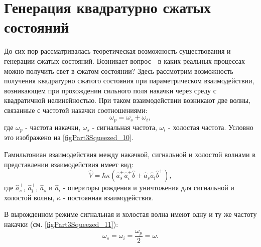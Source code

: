\section{Генерация квадратурно сжатых состояний}
\label{pNonClassGenerSqueezed}
До сих пор рассматривалась теоретическая возможность существования и
генерации сжатых состояний. Возникает вопрос - в каких реальных
процессах можно получить свет в сжатом состоянии? Здесь рассмотрим
возможность получения квадратурно сжатого состояния при
параметрическом взаимодействии, возникающем при прохождении сильного
поля накачки через среду с квадратичной нелинейностью. При таком
взаимодействии возникают две волны, связанные с частотой накачки
соотношениями:
\begin{equation}
\omega_p = \omega_s + \omega_i,
\nonumber
\end{equation}
где $\omega_p$ - частота накачки, $\omega_s$ - сигнальная частота,
$\omega_i$ - холостая частота. Условно это изображено на 
\autoref{figPart3Squeezed_10}.



Гамильтониан взаимодействия между накачкой, сигнальной и холостой
волнами в представлении взаимодействия имеет вид:
\begin{equation}
\hat{V} = \hbar \kappa \left(
\hat{a}^{+}_s \hat{a}^{+}_i \hat{b} + 
\hat{a}_s \hat{a}_i \hat{b}^{+}
\right),
\label{eqPart3Squeezed30}
\end{equation}
где $\hat{a}^{+}_s$, $\hat{a}^{+}_i$, 
$\hat{a}_s$ и $\hat{a}_i$ - операторы рождения и уничтожения для
сигнальной и холостой волны, $\kappa$ - постоянная взаимодействия.



В вырожденном режиме сигнальная и холостая волна имеют одну и ту же
частоту накачки (см. \autoref{figPart3Squeezed_11}):
\[
\omega_s = \omega_i = \frac{\omega_p}{2} = \omega.
\]

